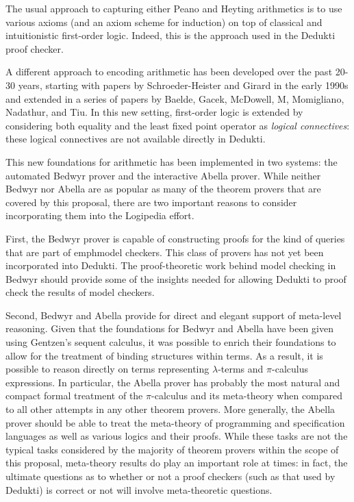 The usual approach to capturing either Peano and Heyting arithmetics
is to use various axioms (and an axiom scheme for induction) on top of
classical and intuitionistic first-order logic.  Indeed, this is the
approach used in the Dedukti proof checker.


A different approach to encoding arithmetic has been developed over
the past 20-30 years, starting with papers by Schroeder-Heister and
Girard in the early 1990s and extended in a series of papers by
Baelde, Gacek, McDowell, M, Momigliano, Nadathur, and Tiu.  In this
new setting, first-order logic is extended by considering both
equality and the least fixed point operator as \emph{logical
  connectives}: these logical connectives are not available directly
in Dedukti.

This new foundations for arithmetic has been implemented in two
systems: the automated Bedwyr prover and the interactive Abella
prover.  While neither Bedwyr nor Abella are as popular as many of the
theorem provers that are covered by this proposal, there are two
important reasons to consider incorporating them into the Logipedia
effort.

First, the Bedwyr prover is capable of constructing proofs for the
kind of queries that are part of emph{model checkers}.  This class of
provers has not yet been incorporated into Dedukti.  The
proof-theoretic work behind model checking in Bedwyr should provide
some of the insights needed for allowing Dedukti to proof check the
results of model checkers.

Second, Bedwyr and Abella provide for direct and elegant support of
meta-level reasoning.  Given that the foundations for Bedwyr and
Abella have been given using Gentzen's sequent calculus, it was
possible to enrich their foundations to allow for the treatment of
binding structures within terms.  As a result, it is possible to
reason directly on terms representing $\lambda$-terms and
$\pi$-calculus expressions.  In particular, the Abella prover has
probably the most natural and compact formal treatment of the
$\pi$-calculus and its meta-theory when compared to all other attempts
in any other theorem provers.  More generally, the Abella prover
should be able to treat the meta-theory of programming and
specification languages as well as various logics and their
proofs. While these tasks are not the typical tasks considered by the
majority of theorem provers within the scope of this proposal,
meta-theory results do play an important role at times: in fact, the
ultimate questions as to whether or not a proof checkers (such as that
used by Dedukti) is correct or not will involve meta-theoretic
questions.

